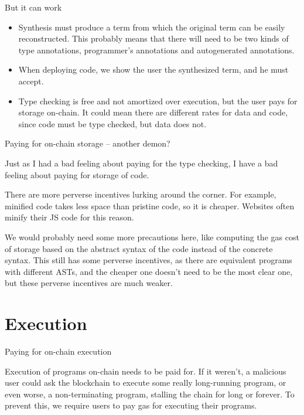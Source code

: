 \documentclass{beamer}
\begin{document}
\begin{frame}{But it can work}

\begin{itemize}
  \item Synthesis must produce a term from which the original term can be easily reconstructed. This probably means that there will need to be two kinds of type annotations, programmer's annotations and autogenerated annotations.
  \item When deploying code, we show the user the synthesized term, and he must accept.
  \item Type checking is free and not amortized over execution, but the user pays for storage on-chain. It could mean there are different rates for data and code, since code must be type checked, but data does not.
\end{itemize}

\end{frame}

\begin{frame}{Paying for on-chain storage -- another demon?}

Just as I had a bad feeling about paying for the type checking, I have a bad feeling about paying for storage of code.

\vspace{2em}

There are more perverse incentives lurking around the corner. For example, minified code takes less space than pristine code, so it is cheaper. Websites often minify their JS code for this reason.

\vspace{2em}

We would probably need some more precautions here, like computing the gas cost of storage based on the abstract syntax of the code instead of the concrete syntax. This still has some perverse incentives, as there are equivalent programs with different ASTs, and the cheaper one doesn't need to be the most clear one, but these perverse incentives are much weaker.

\end{frame}

\section{Execution}

\begin{frame}{Paying for on-chain execution}

Execution of programs on-chain needs to be paid for. If it weren't, a malicious user could ask the blockchain to execute some really long-running program, or even worse, a non-terminating program, stalling the chain for long or forever. To prevent this, we require users to pay gas for executing their programs.

\end{frame}
\end{document}
